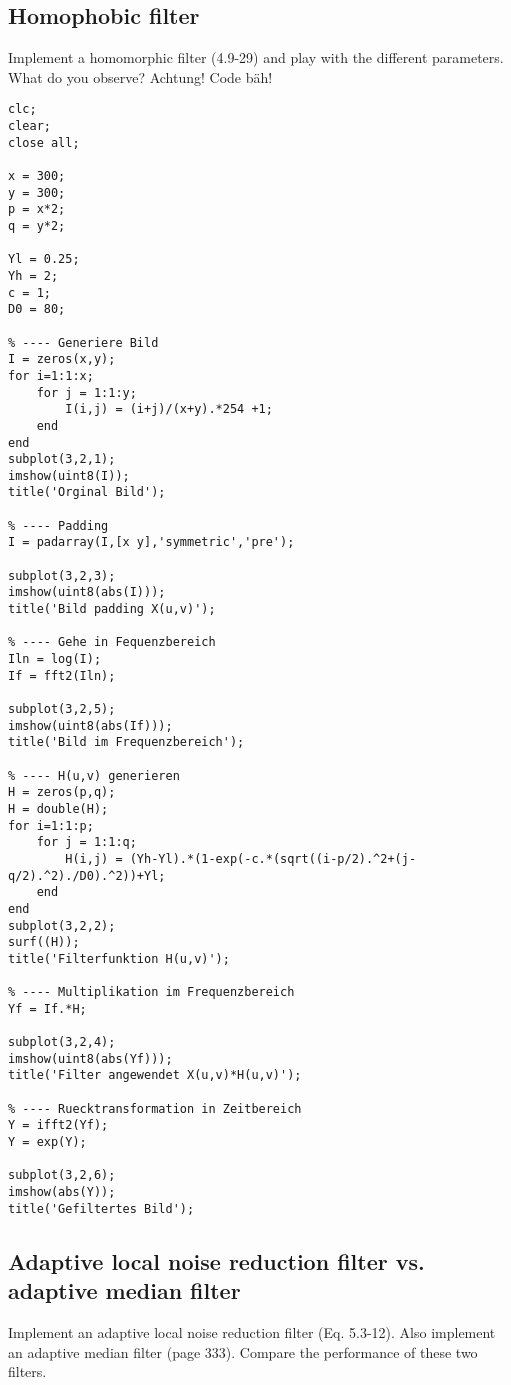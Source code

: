 \subsection{Homophobic filter}
Implement a homomorphic filter (4.9-29) and play with the different parameters.
What do you observe?
Achtung! Code bäh!
\begin{lstlisting}
clc;
clear;
close all;

x = 300;
y = 300;
p = x*2;
q = y*2;

Yl = 0.25;
Yh = 2;
c = 1;
D0 = 80;

% ---- Generiere Bild
I = zeros(x,y);
for i=1:1:x;
    for j = 1:1:y;
        I(i,j) = (i+j)/(x+y).*254 +1;
    end
end
subplot(3,2,1);
imshow(uint8(I));
title('Orginal Bild');

% ---- Padding
I = padarray(I,[x y],'symmetric','pre');

subplot(3,2,3);
imshow(uint8(abs(I)));
title('Bild padding X(u,v)');

% ---- Gehe in Fequenzbereich
Iln = log(I);
If = fft2(Iln);

subplot(3,2,5);
imshow(uint8(abs(If)));
title('Bild im Frequenzbereich');

% ---- H(u,v) generieren
H = zeros(p,q);
H = double(H);
for i=1:1:p;
    for j = 1:1:q;
        H(i,j) = (Yh-Yl).*(1-exp(-c.*(sqrt((i-p/2).^2+(j-q/2).^2)./D0).^2))+Yl;
    end
end
subplot(3,2,2);
surf((H));
title('Filterfunktion H(u,v)');

% ---- Multiplikation im Frequenzbereich
Yf = If.*H;

subplot(3,2,4);
imshow(uint8(abs(Yf)));
title('Filter angewendet X(u,v)*H(u,v)');

% ---- Ruecktransformation in Zeitbereich
Y = ifft2(Yf);
Y = exp(Y);

subplot(3,2,6);
imshow(abs(Y));
title('Gefiltertes Bild');

\end{lstlisting}
\subsection{Adaptive local noise reduction filter vs. adaptive median filter}
Implement an adaptive local noise reduction filter (Eq. 5.3-12). Also implement
an adaptive median filter (page 333). Compare the performance of these two filters.
